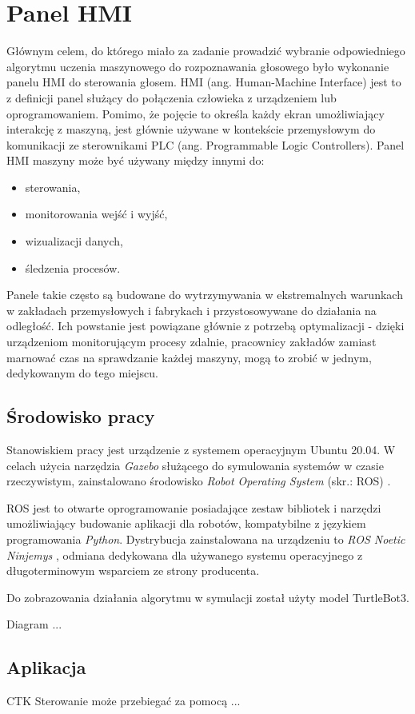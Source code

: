 \chapter{Panel HMI}
\label{}

Głównym celem, do którego miało za zadanie prowadzić wybranie odpowiedniego algorytmu uczenia maszynowego do rozpoznawania głosowego było wykonanie panelu HMI do sterowania głosem. HMI (ang. Human-Machine Interface) jest to z definicji panel służący do połączenia człowieka z urządzeniem lub oprogramowaniem. Pomimo, że pojęcie to określa każdy ekran umożliwiający interakcję z maszyną, jest głównie używane w kontekście przemysłowym do komunikacji ze sterownikami PLC (ang. Programmable Logic Controllers). 
Panel HMI maszyny może być używany między innymi do:
\begin{itemize}
    \item sterowania,
    \item monitorowania wejść i wyjść,
    \item wizualizacji danych,
    \item śledzenia procesów.
\end{itemize}
Panele takie często są budowane do wytrzymywania w ekstremalnych warunkach w zakładach przemysłowych i fabrykach i przystosowywane do działania na odległość. Ich powstanie jest powiązane głównie z potrzebą optymalizacji - dzięki urządzeniom monitorującym procesy zdalnie, pracownicy zakładów zamiast marnować czas na sprawdzanie każdej maszyny, mogą to zrobić w jednym, dedykowanym do tego miejscu. 


\section{Środowisko pracy}
\label{}

Stanowiskiem pracy jest urządzenie z systemem operacyjnym Ubuntu 20.04. W celach użycia narzędzia \textit{Gazebo} \cite{gazebo} służącego do symulowania systemów w czasie rzeczywistym, zainstalowano środowisko \textit{Robot Operating System} (skr.: ROS) \cite{ros}. 

ROS \cite{ros} jest to otwarte oprogramowanie posiadające zestaw bibliotek i narzędzi umożliwiający budowanie aplikacji dla robotów, kompatybilne z językiem programowania \textit{Python}. Dystrybucja zainstalowana na urządzeniu to \textit{ROS Noetic Ninjemys} \cite{noetic}, odmiana dedykowana dla używanego systemu operacyjnego z długoterminowym wsparciem ze strony producenta. 

Do zobrazowania działania algorytmu w symulacji został użyty model TurtleBot3. 

Diagram ...


\section{Aplikacja}
\label{}

CTK
Sterowanie może przebiegać za pomocą ...